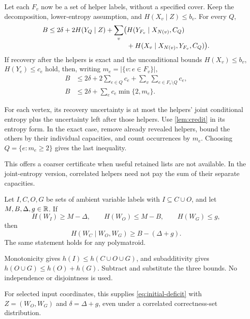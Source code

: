 \begin{proposition}\label{prop:uncoupled}
Let each $F_v$ now be a set of helper labels, without a specified cover.
Keep the decomposition, lower-entropy assumption, and
$H(X_v\mid Z)\le b_v$. For every $Q$,
\begin{align}
B\le 2\delta+2H(Y_Q\mid Z)
 +\sum_v\bigl(&H(Y_{F_v}\mid X_{N(v)},C_Q)\notag\\[-2pt]
              &+H(X_v\mid X_{N(v)},Y_{F_v},C_Q)\bigr).
\label{eq:joint-helpers}
\end{align}
If recovery after the helpers is exact and the unconditional bounds
$H(X_v)\le b_v$, $H(Y_e)\le c_e$ hold, then, writing
$m_e=|\{v:e\in F_v\}|$,
\begin{align*}
B&\le2\delta+2\sum_{e\in Q}c_e+\sum_v\sum_{e\in F_v\setminus Q}c_e,\\
B&\le2\delta+\sum_e c_e\min\{2,m_e\}.
\end{align*}
\end{proposition}
\begin{outline}
For each vertex, its recovery uncertainty is at most the helpers'
joint conditional entropy plus the uncertainty left after those helpers.
Use \cref{lem:credit} in its entropy form. In the exact case, remove
already revealed helpers, bound the others by their individual
capacities, and count occurrences by $m_e$. Choosing
$Q=\{e:m_e\ge2\}$ gives the last inequality.
\end{outline}
This offers a coarser certificate when useful retained lists are not
available. In the joint-entropy version, correlated helpers need not
pay the sum of their separate capacities.

\begin{lemma}\label{lem:initial}
Let $I,C,O,G$ be sets of ambient variable labels with $I\subseteq C\cup O$,
and let $M,B,\Delta,g\in\mathbb{R}$. If
\[
H(W_I)\ge M-\Delta,\qquad
H(W_O)\le M-B,\qquad H(W_G)\le g,
\]
then
\[
H(W_C\mid W_O,W_G)\ge B-(\Delta+g).
\]
The same statement holds for any polymatroid.
\end{lemma}
\begin{outline}
Monotonicity gives $h(I)\le h(C\cup O\cup G)$, and subadditivity
gives $h(O\cup G)\le h(O)+h(G)$. Subtract and substitute the three
bounds. No independence or disjointness is used.
\end{outline}
For selected input coordinates, this supplies \eqref{eq:initial-deficit}
with $Z=(W_O,W_G)$ and $\delta=\Delta+g$, even under a correlated
correctness-set distribution.
